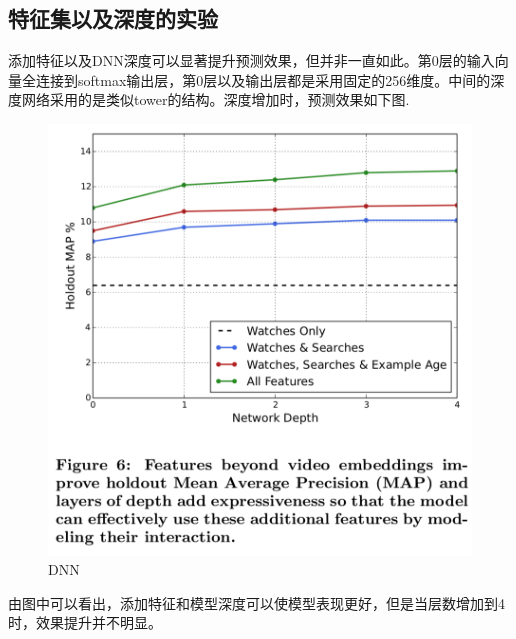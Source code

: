 \documentclass[UTF8]{ctexart}
\begin{document}
	\subsection{特征集以及深度的实验}
	添加特征以及DNN深度可以显著提升预测效果，但并非一直如此。第0层的输入向量全连接到softmax输出层，第0层以及输出层都是采用固定的256维度。中间的深度网络采用的是类似tower的结构。深度增加时，预测效果如下图.
	\begin{figure}[ht]
	    \centering
	    \includegraphics[scale=0.5]{picture/005.png}
	    \caption{DNN}
	    \label{fig:005}
	\end{figure}
	由图中可以看出，添加特征和模型深度可以使模型表现更好，但是当层数增加到4时，效果提升并不明显。
\end{document}
